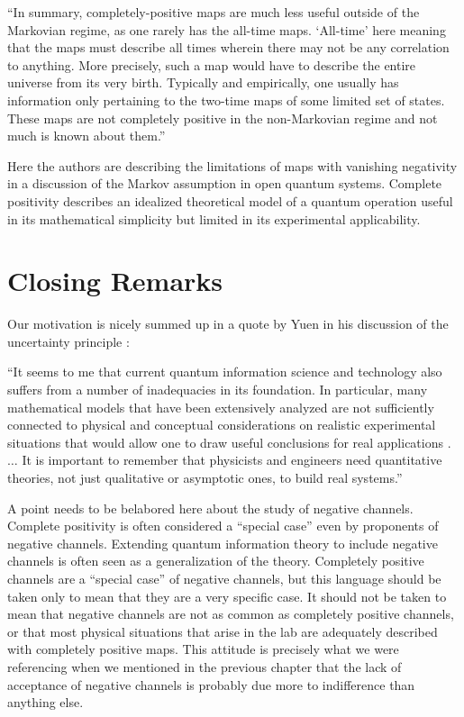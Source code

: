 ``In summary, completely-positive maps are much less useful outside of the Markovian regime, as one rarely has the all-time maps. `All-time' here meaning that the maps must describe all times wherein there may not be any correlation to anything. More precisely, such a map would have to describe the entire universe from its very birth. Typically and empirically, one usually has information only pertaining to the two-time maps of some limited set of states. These maps are not completely positive in the non-Markovian regime and not much is known about them.'' 

Here the authors are describing the limitations of maps with vanishing negativity in a discussion of the Markov assumption in open quantum systems.  Complete positivity describes an idealized theoretical model of a quantum operation useful in its mathematical simplicity but limited in its experimental applicability.   

\section{Closing Remarks}
Our motivation is nicely summed up in a quote by Yuen in his discussion of the uncertainty principle \cite{Yuen2005}:

``It seems to me that current quantum information science and technology also suffers from a number of inadequacies in its foundation. In particular, many mathematical models that have been extensively analyzed are not sufficiently connected to physical and conceptual considerations on realistic experimental situations that would allow one to draw useful conclusions for real applications .$\ldots$ It is important to remember that physicists and engineers need quantitative theories, not just qualitative or asymptotic ones, to build real systems.''

A point needs to be belabored here about the study of negative channels.  Complete positivity is often considered a ``special case'' even by proponents of negative channels.  Extending quantum information theory to include negative channels is often seen as a generalization of the theory.  Completely positive channels are a ``special case'' of negative channels, but this language should be taken only to mean that they are a very specific case.  It should not be taken to mean that negative channels are not as common as completely positive channels, or that most physical situations that arise in the lab are adequately described with completely positive maps.  This attitude is precisely what we were referencing when we mentioned in the previous chapter that the lack of acceptance of negative channels is probably due more to indifference than anything else.  

